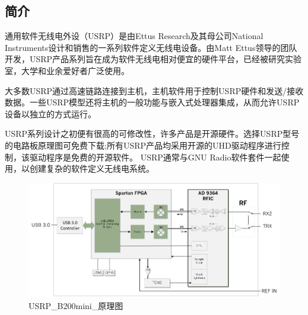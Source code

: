 	\subsection{简介}
	\par 通用软件无线电外设（USRP）是由Ettus Research及其母公司National Instruments设计和销售的一系列软件定义无线电设备。由Matt Ettus领导的团队开发，USRP产品系列旨在成为软件无线电相对便宜的硬件平台，已经被研究实验室，大学和业余爱好者广泛使用。
	\par 大多数USRP通过高速链路连接到主机，主机软件用于控制USRP硬件和发送/接收数据。一些USRP模型还将主机的一般功能与嵌入式处理器集成，从而允许USRP设备以独立的方式运行。
	\par USRP系列设计之初便有很高的可修改性，许多产品是开源硬件。选择USRP型号的电路板原理图可免费下载;所有USRP产品均采用开源的UHD驱动程序进行控制，该驱动程序是免费的开源软件。 USRP通常与GNU Radio软件套件一起使用，以创建复杂的软件定义无线电系统。\cite{ wiki:USRP}
	\begin{figure}[htb]
		\centering
		\includegraphics[width=13cm]{figures/USRP_B200mini_BD.png}
		\caption{USRP\_B200mini\_原理图}
		\label{fig:USRP_B200mini_原理图}
	\end{figure}
